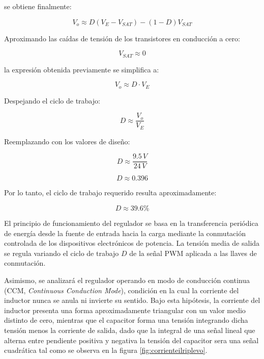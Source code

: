 \documentclass[]{article}
\begin{document}
	se obtiene finalmente:
	
	\begin{equation}
		V_o \approx D(V_E - V_{SAT}) - (1-D)V_{SAT}
	\end{equation}
	
	
	Aproximando las caídas de tensión de los transistores en conducción a cero:
	
	\begin{equation}
		V_{SAT} \approx 0
	\end{equation}
	
	la expresión obtenida previamente se simplifica a:
	
	\begin{equation}
		V_o \approx D \cdot V_E
	\end{equation}
	
	Despejando el ciclo de trabajo:
	
	\begin{equation}
		D \approx \frac{V_o}{V_E}
	\end{equation}
	
	Reemplazando con los valores de diseño:
	
	\begin{equation}
		D \approx \frac{9.5\,V}{24\,V}
	\end{equation}
	
	\begin{equation}
		D \approx 0.396
	\end{equation}
	
	Por lo tanto, el ciclo de trabajo requerido resulta aproximadamente:
	
	\begin{equation}
		D \approx 39.6\%
	\end{equation}
	
	
	El principio de funcionamiento del regulador se basa en la transferencia periódica de energía desde la fuente de entrada hacia la carga mediante la conmutación controlada de los dispositivos electrónicos de potencia. La tensión media de salida se regula variando el ciclo de trabajo $D$ de la señal PWM aplicada a las llaves de conmutación.

	
	Asimismo, se analizará el regulador operando en modo de conducción continua (CCM, \textit{Continuous Conduction Mode}), condición en la cual la corriente del inductor nunca se anula ni invierte su sentido. Bajo esta hipótesis, la corriente del inductor presenta una forma aproximadamente triangular con un valor medio distinto de cero, mientras que el capacitor forma una tensión integrando dicha tensión menos la corriente de salida, dado que la integral de una señal lineal que alterna entre pendiente positiva y negativa la tensión del capacitor sera una señal cuadrática tal como se observa en la figura \ref{fig:corrienteilriplevo}.
	
\end{document}
